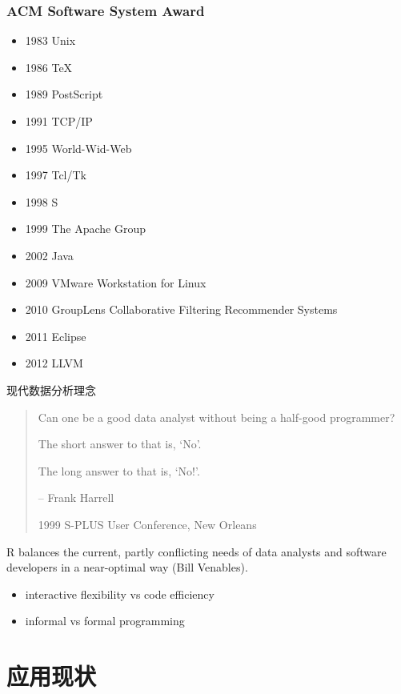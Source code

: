 \documentclass[UTF8,                %
               table,               %
               9pt,                %
               aspectratio=43]      %
               {beamer}
\begin{document}
\begin{frame}
\frametitle{ACM Software System Award}
        \begin{itemize}
            \setlength{\itemsep}{-0.00cm}
          \item 1983 Unix
          \item 1986 TeX
          \item 1989 PostScript
          \item 1991 TCP/IP
          \item 1995 World-Wid-Web
          \item 1997 Tcl/Tk
          \item 1998 S
          \item 1999 The Apache Group
          \item 2002 Java
          \item 2009 VMware Workstation for Linux
          \item 2010 GroupLens Collaborative Filtering Recommender Systems
          \item 2011 Eclipse
          \item 2012 LLVM
        \end{itemize}
\end{frame}

\begin{frame}{现代数据分析理念}
  \begin{quotation}
    Can one be a good data analyst without being a half-good programmer?

    The short answer to that is, `No'.

    The long answer to that is, `No!'.

    -- Frank Harrell

    1999 S-PLUS User Conference, New Orleans
  \end{quotation}

R balances the current, partly conflicting needs of data analysts
and software developers in a near-optimal way (Bill Venables).
\begin{itemize}
  \item interactive flexibility vs code efficiency
  \item informal vs formal programming
\end{itemize}
\end{frame}

\section{应用现状}
\end{document}
